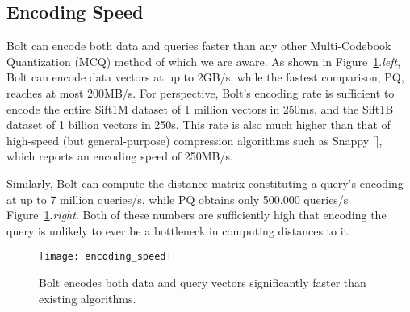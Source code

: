 \subsection{Encoding Speed}

Bolt can encode both data and queries faster than any other Multi-Codebook Quantization (MCQ) method of which we are aware. As shown in Figure~\ref{fig:encoding_speeds}.\textit{left}, Bolt can encode data vectors at up to 2GB/s, while the fastest comparison, PQ, reaches at most 200MB/s. For perspective, Bolt's encoding rate is sufficient to encode the entire Sift1M dataset of 1 million vectors in 250ms, and the Sift1B dataset of 1 billion vectors in 250s. This rate is also much higher than that of high-speed (but general-purpose) compression algorithms such as Snappy [], which reports an encoding speed of 250MB/s.

Similarly, Bolt can compute the distance matrix constituting a query's encoding at up to 7 million queries/s, while PQ obtains only 500,000 queries/s Figure~\ref{fig:encoding_speeds}.\textit{right}. Both of these numbers are sufficiently high that encoding the query is unlikely to ever be a bottleneck in computing distances to it.

\begin{figure}[h]
\begin{center}
\label{fig:encoding_speeds}
\texttt{[image: encoding\_speed]}
\vspace*{-1mm}
\caption{Bolt encodes both data and query vectors significantly faster than existing algorithms.}
\end{center}
\end{figure}


